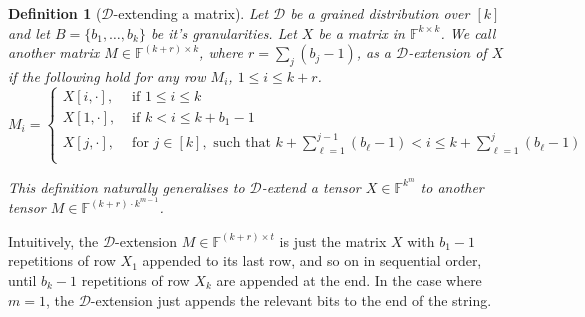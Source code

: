 \documentclass[10pt,a4paper]{article}
\newtheorem{definition}{Definition}[section]
\newcommand{\F}{\mathbb{F}}
\newcommand{\sD}{\mathcal{D}}
\begin{document}
\begin{definition}[$\sD$-extending a matrix]
    \label{def:extend_matrix}
    Let $\sD$ be a grained distribution over $[k]$ and let $B = \{b_1, \dots, b_k\}$ be it's granularities. Let $X$ be a matrix in $\F^{k \times k}$. We call another matrix $M \in \F^{(k+r) \times k}$, where $r = \sum_j (b_j-1)$, as a $\sD$-extension of $X$ if the following hold for any row $M_i$, $1 \leq i \leq k+r$.   
    \begin{equation}
        M_i = 
        \begin{cases}
            X[i,\cdot], & \text{ if } 1 \leq i \leq k \\
            X[1,\cdot], & \text{ if } k < i \leq k+b_1-1 \\
            X[j,\cdot], & \text{ for } j \in [k], \text{ such that } k + \sum_{\ell = 1}^{j-1} (b_\ell-1) < i \leq k + \sum_{\ell = 1}^j (b_\ell-1) \\
        \end{cases}
    \end{equation}

    This definition naturally generalises to $\sD$-extend a tensor $X \in \F^{k^m}$ to another tensor $M \in \F^{(k+r) \cdot k^{m-1}}$.
\end{definition}
Intuitively, the $\sD$-extension $M \in \F^{(k+r) \times t}$ is just the matrix $X$ with $b_1-1$ repetitions of row $X_1$ appended to its last row, and so on in sequential order, until $b_k-1$ repetitions of row $X_k$ are appended at the end. In the case where $m=1$, the $\sD$-extension just appends the relevant bits to the end of the string.
\end{document}
